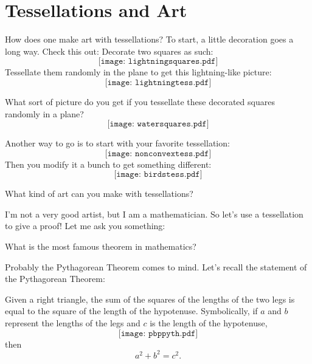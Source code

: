 \documentclass{ximera}
\begin{document}
\section{Tessellations and Art}

How does one make art with tessellations? To start, a little
decoration goes a long way. Check this out: Decorate two squares as
such:
\[
\texttt{[image: lightningsquares.pdf]}
\]
Tessellate them randomly in the plane to get this lightning-like picture:
\[
\texttt{[image: lightningtess.pdf]}
\]
\begin{question} 
What sort of picture do you get if you tessellate these decorated
squares randomly in a plane?
\[
\texttt{[image: watersquares.pdf]}
\]
\end{question}


Another way to go is to start with your favorite tessellation:
\[
\texttt{[image: nonconvextess.pdf]}
\]
Then you modify it a bunch to get something different:
\[
\texttt{[image: birdstess.pdf]}
\]

\begin{question} What kind of art can you make with tessellations?
\end{question}



I'm not a very good artist, but I am a mathematician. So let's use a
tessellation to give a proof! Let me ask you something:

\begin{question} What is the most famous theorem in mathematics? 
\end{question}
Probably the Pythagorean Theorem comes to mind. Let's recall the statement of the Pythagorean Theorem:

\begin{theorem} Given a right triangle, the sum of the squares of the 
lengths of the two legs is equal to the square of the length of 
the hypotenuse.  Symbolically, if $a$ and $b$ represent the 
lengths of the legs and $c$ is the length of the hypotenuse, 
\[
\texttt{[image: pbppyth.pdf]}
\]
then 
\[
a^2 + b^2 = c^2.
\]
\end{theorem}
\end{document}
